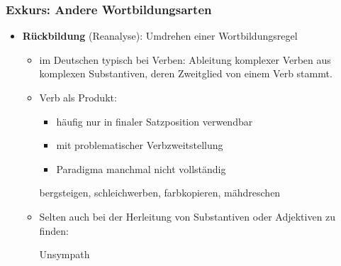 \begin{frame}
\frametitle{Exkurs: Andere Wortbildungsarten}

\begin{itemize}
\item \textbf{Rückbildung} (Reanalyse): Umdrehen einer Wortbildungsregel

\begin{itemize}
\item im Deutschen typisch bei Verben: Ableitung komplexer Verben aus komplexen Substantiven, deren Zweitglied von einem Verb stammt.
\item Verb als Produkt: 

\begin{itemize}
	\item häufig nur in finaler Satzposition verwendbar
	
	\item mit problematischer Verbzweitstellung
	
	\item Paradigma manchmal nicht vollständig
\end{itemize}

\ea bergsteigen, schleichwerben, farbkopieren, mähdreschen
\z

\item Selten auch bei der Herleitung von Substantiven oder Adjektiven zu finden:

\ea Unsympath
\z

\end{itemize}
\end{itemize}


\end{frame}


